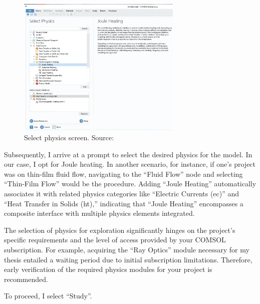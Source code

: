 \begin{figure}[H]
  \centering
  \includegraphics[width=0.7\textwidth]{Chapters/Figures/Chapter 3 Figures/Select Physics.png}
  \caption{Select physics screen. Source: \cite{multiphysics__modeling_nodate}}
  \label{fig:Select Physics}
\end{figure}

Subsequently, I arrive at a prompt to select the desired physics for the model. In our case, I opt for Joule heating. In another scenario, for instance, if one's project was on thin-film fluid flow, navigating to the ``Fluid Flow'' node and selecting ``Thin-Film Flow'' would be the procedure. Adding ``Joule Heating'' automatically associates it with related physics categories like ``Electric Currents (ec)'' and ``Heat Transfer in Solids (ht),'' indicating that ``Joule Heating'' encompasses a composite interface with multiple physics elements integrated.

The selection of physics for exploration significantly hinges on the project's specific requirements and the level of access provided by your COMSOL subscription. For example, acquiring the ``Ray Optics'' module necessary for my thesis entailed a waiting period due to initial subscription limitations. Therefore, early verification of the required physics modules for your project is recommended.

To proceed, I select ``Study''.

